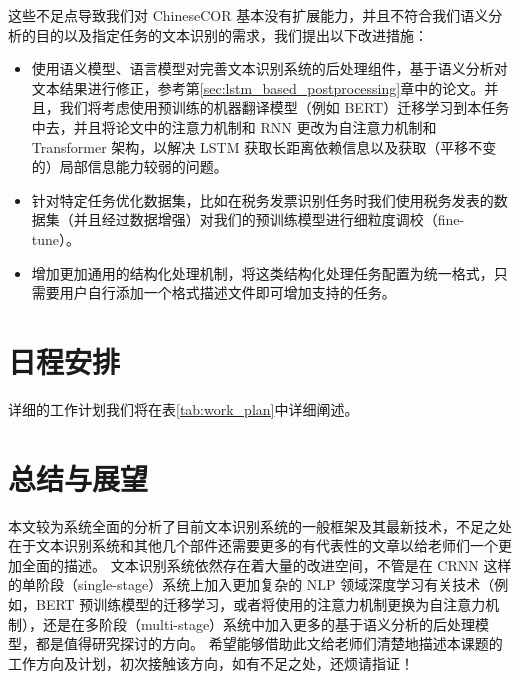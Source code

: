 这些不足点导致我们对 ChineseCOR 基本没有扩展能力，并且不符合我们语义分析的目的以及指定任务的文本识别的需求，我们提出以下改进措施：
\begin{itemize}
	\item 使用语义模型、语言模型对完善文本识别系统的后处理组件，基于语义分析对文本结果进行修正，参考第\ref{sec:lstm_based_postprocessing}章中的论文。并且，我们将考虑使用预训练的机器翻译模型（例如 BERT）迁移学习到本任务中去，并且将论文中的注意力机制和 RNN 更改为自注意力机制和 Transformer 架构，以解决 LSTM 获取长距离依赖信息以及获取（平移不变的）局部信息能力较弱的问题。
	\item 针对特定任务优化数据集，比如在税务发票识别任务时我们使用税务发表的数据集（并且经过数据增强）对我们的预训练模型进行细粒度调校（fine-tune）。
	\item 增加更加通用的结构化处理机制，将这类结构化处理任务配置为统一格式，只需要用户自行添加一个格式描述文件即可增加支持的任务。
\end{itemize}

\chapter{日程安排}
详细的工作计划我们将在表\ref{tab:work_plan}中详细阐述。

\chapter{总结与展望}
\label{chap:conclusions}  
本文较为系统全面的分析了目前文本识别系统的一般框架及其最新技术，不足之处在于文本识别系统和其他几个部件还需要更多的有代表性的文章以给老师们一个更加全面的描述。
文本识别系统依然存在着大量的改进空间，不管是在 CRNN 这样的单阶段（single-stage）系统上加入更加复杂的 NLP 领域深度学习有关技术（例如，BERT 预训练模型的迁移学习，或者将使用的注意力机制更换为自注意力机制），还是在多阶段（multi-stage）系统中加入更多的基于语义分析的后处理模型，都是值得研究探讨的方向。
希望能够借助此文给老师们清楚地描述本课题的工作方向及计划，初次接触该方向，如有不足之处，还烦请指证！

